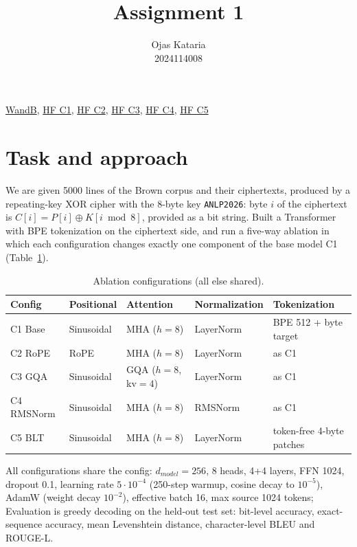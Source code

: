 \documentclass[12pt]{article}
\title{Assignment 1}
\author{Ojas Kataria\\2024114008}
\date{}
\begin{document}
\maketitle

\href{https://wandb.ai/irishbumfuzzle-team/anlp-assignment1/workspace?nw=nwuseririshbumfuzzle}{WandB},
\href{https://huggingface.co/irishbumfuzzle/anlp-a1-C1}{HF C1},
\href{https://huggingface.co/irishbumfuzzle/anlp-a1-C2}{HF C2},
\href{https://huggingface.co/irishbumfuzzle/anlp-a1-C3}{HF C3},
\href{https://huggingface.co/irishbumfuzzle/anlp-a1-C4}{HF C4},
\href{https://huggingface.co/irishbumfuzzle/anlp-a1-C5}{HF C5}

\section{Task and approach}
We are given 5000 lines of the Brown corpus and their
ciphertexts, produced by a repeating-key XOR cipher with the 8-byte key
\texttt{ANLP2026}: byte $i$ of the ciphertext is $C[i] = P[i] \oplus K[i \bmod 8]$,
provided as a bit string. Built a Transformer
with BPE tokenization on the ciphertext side, and run a
five-way ablation in which each configuration changes exactly one component of
the base model C1 (Table~\ref{tab:configs}).

\begin{table}[h]
\centering\small
\setlength{\tabcolsep}{4.5pt}
\caption{Ablation configurations (all else shared).}
\label{tab:configs}
\begin{tabular}{lllll}
\toprule
Config & Positional & Attention & Normalization & Tokenization \\
\midrule
C1 Base    & Sinusoidal & MHA ($h{=}8$) & LayerNorm & BPE 512 + byte target \\
C2 RoPE    & RoPE       & MHA ($h{=}8$) & LayerNorm & as C1 \\
C3 GQA     & Sinusoidal & GQA ($h{=}8$, kv$=4$) & LayerNorm & as C1 \\
C4 RMSNorm & Sinusoidal & MHA ($h{=}8$) & RMSNorm   & as C1 \\
C5 BLT     & Sinusoidal & MHA ($h{=}8$) & LayerNorm & token-free 4-byte patches \\
\bottomrule
\end{tabular}
\end{table}

All configurations share the config: $d_{model}{=}256$, 8 heads,
4+4 layers, FFN 1024, dropout 0.1, learning rate $5\cdot10^{-4}$ (250-step warmup,
cosine decay to $10^{-5}$), AdamW (weight decay $10^{-2}$), effective batch 16,
max source 1024 tokens; Evaluation is greedy decoding on the held-out test
set: bit-level accuracy, exact-sequence accuracy, mean Levenshtein distance,
character-level BLEU and ROUGE-L.
\end{document}
